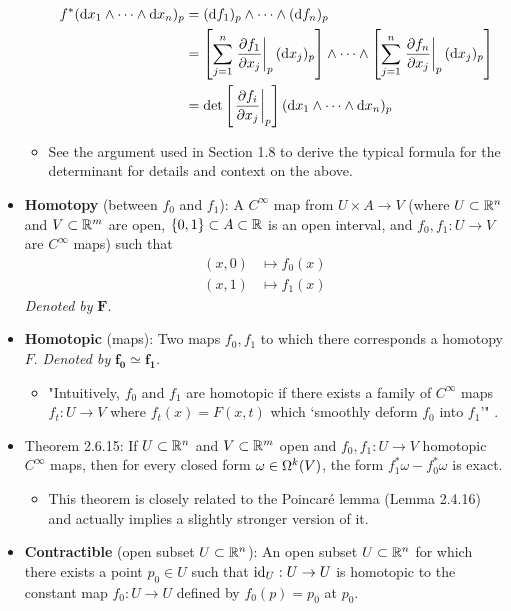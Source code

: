 \documentclass[../notes.tex]{subfiles}
\begin{document}
\begin{itemize}
\begin{itemize}
        \begin{align*}
            f^*(\dd{x_1}\wedge\cdots\wedge\dd{x_n})_p &= (\dd f_1)_p\wedge\cdots\wedge(\dd f_n)_p\\
            &= \left[ \sum_{j=1}^n\eval{\pdv{f_1}{x_j}}_p(\dd x_j)_p \right]\wedge\cdots\wedge\left[ \sum_{j=1}^n\eval{\pdv{f_n}{x_j}}_p(\dd x_j)_p \right]\\
            &= \det\left[ \eval{\pdv{f_i}{x_j}}_p \right](\dd x_1\wedge\cdots\wedge\dd x_n)_p
        \end{align*}
        \item See the argument used in Section 1.8 to derive the typical formula for the determinant for details and context on the above.
    \end{itemize}
    \item \textbf{Homotopy} (between $f_0$ and $f_1$): A $C^\infty$ map from $U\times A\to V$ (where $U\subset\R^n$ and $V\subset\R^m$ are open, $\{0,1\}\subset A\subset\R$ is an open interval, and $f_0,f_1:U\to V$ are $C^\infty$ maps) such that
    \begin{align*}
        (x,0) &\mapsto f_0(x)\\
        (x,1) &\mapsto f_1(x)
    \end{align*}
    \emph{Denoted by} $\bm{F}$.
    \item \textbf{Homotopic} (maps): Two maps $f_0,f_1$ to which there corresponds a homotopy $F$. \emph{Denoted by} $\bm{f_0\simeq f_1}$.
    \begin{itemize}
        \item "Intuitively, $f_0$ and $f_1$ are homotopic if there exists a family of $C^\infty$ maps $f_t:U\to V$ where $f_t(x)=F(x,t)$ which `smoothly deform $f_0$ into $f_1$'" \parencite[56]{bib:DifferentialForms}.
    \end{itemize}
    \item Theorem 2.6.15: If $U\subset\R^n$ and $V\subset\R^m$ open and $f_0,f_1:U\to V$ homotopic $C^\infty$ maps, then for every closed form $\omega\in\ome[k]{V}$, the form $f_1^*\omega-f_0^*\omega$ is exact.
    \begin{itemize}
        \item This theorem is closely related to the Poincar\'{e} lemma (Lemma 2.4.16) and actually implies a slightly stronger version of it.
    \end{itemize}
    \item \textbf{Contractible} (open subset $U\subset\R^n$): An open subset $U\subset\R^n$ for which there exists a point $p_0\in U$ such that $\id_U:U\to U$ is homotopic to the constant map $f_0:U\to U$ defined by $f_0(p)=p_0$ at $p_0$.

\end{itemize}
\end{document}
